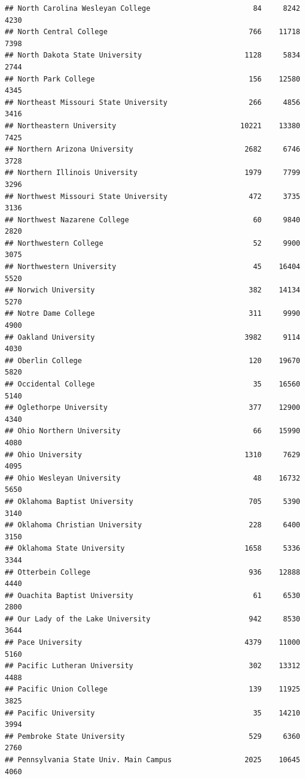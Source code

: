 \documentclass[
]{article}
\begin{document}
\begin{verbatim}
## North Carolina Wesleyan College                        84     8242       4230
## North Central College                                 766    11718       7398
## North Dakota State University                        1128     5834       2744
## North Park College                                    156    12580       4345
## Northeast Missouri State University                   266     4856       3416
## Northeastern University                             10221    13380       7425
## Northern Arizona University                          2682     6746       3728
## Northern Illinois University                         1979     7799       3296
## Northwest Missouri State University                   472     3735       3136
## Northwest Nazarene College                             60     9840       2820
## Northwestern College                                   52     9900       3075
## Northwestern University                                45    16404       5520
## Norwich University                                    382    14134       5270
## Notre Dame College                                    311     9990       4900
## Oakland University                                   3982     9114       4030
## Oberlin College                                       120    19670       5820
## Occidental College                                     35    16560       5140
## Oglethorpe University                                 377    12900       4340
## Ohio Northern University                               66    15990       4080
## Ohio University                                      1310     7629       4095
## Ohio Wesleyan University                               48    16732       5650
## Oklahoma Baptist University                           705     5390       3140
## Oklahoma Christian University                         228     6400       3150
## Oklahoma State University                            1658     5336       3344
## Otterbein College                                     936    12888       4440
## Ouachita Baptist University                            61     6530       2800
## Our Lady of the Lake University                       942     8530       3644
## Pace University                                      4379    11000       5160
## Pacific Lutheran University                           302    13312       4488
## Pacific Union College                                 139    11925       3825
## Pacific University                                     35    14210       3994
## Pembroke State University                             529     6360       2760
## Pennsylvania State Univ. Main Campus                 2025    10645       4060

\end{verbatim}
\end{document}
